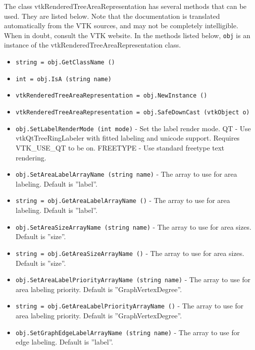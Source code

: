 The class vtkRenderedTreeAreaRepresentation has several methods that can be used.
  They are listed below.
Note that the documentation is translated automatically from the VTK sources,
and may not be completely intelligible.  When in doubt, consult the VTK website.
In the methods listed below, \verb|obj| is an instance of the vtkRenderedTreeAreaRepresentation class.
\begin{itemize}
\item  \verb|string = obj.GetClassName ()|

\item  \verb|int = obj.IsA (string name)|

\item  \verb|vtkRenderedTreeAreaRepresentation = obj.NewInstance ()|

\item  \verb|vtkRenderedTreeAreaRepresentation = obj.SafeDownCast (vtkObject o)|

\item  \verb|obj.SetLabelRenderMode (int mode)| -  Set the label render mode.
 QT - Use vtkQtTreeRingLabeler with fitted labeling
   and unicode support. Requires VTK\_USE\_QT to be on.
 FREETYPE - Use standard freetype text rendering.

\item  \verb|obj.SetAreaLabelArrayName (string name)| -  The array to use for area labeling.  Default is ''label''.

\item  \verb|string = obj.GetAreaLabelArrayName ()| -  The array to use for area labeling.  Default is ''label''.

\item  \verb|obj.SetAreaSizeArrayName (string name)| -  The array to use for area sizes. Default is ''size''.

\item  \verb|string = obj.GetAreaSizeArrayName ()| -  The array to use for area sizes. Default is ''size''.

\item  \verb|obj.SetAreaLabelPriorityArrayName (string name)| -  The array to use for area labeling priority.
 Default is ''GraphVertexDegree''.

\item  \verb|string = obj.GetAreaLabelPriorityArrayName ()| -  The array to use for area labeling priority.
 Default is ''GraphVertexDegree''.

\item  \verb|obj.SetGraphEdgeLabelArrayName (string name)| -  The array to use for edge labeling.  Default is ''label''.


\end{itemize}
